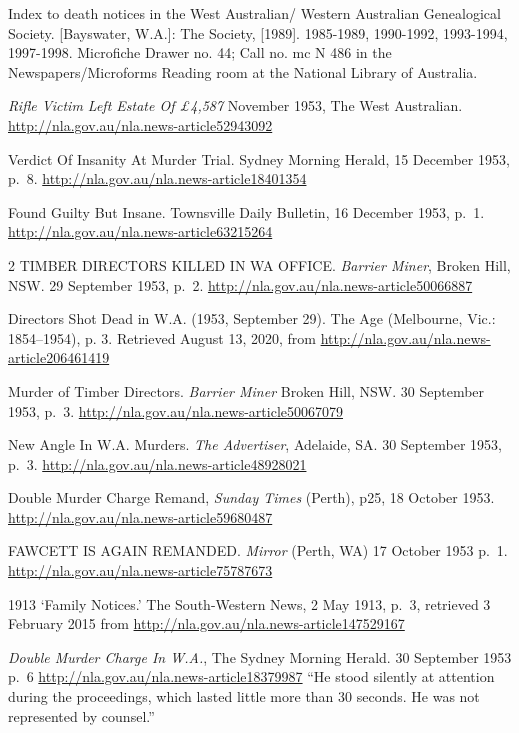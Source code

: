 \begin{thebibliography}{999}
	Index to death notices in the West Australian/ Western Australian Genealogical Society. [Bayswater, W.A.]: The Society, [1989]. 1985-1989, 1990-1992, 1993-1994, 1997-1998. Microfiche Drawer no. 44; Call no. mc N 486 in the Newspapers/Microforms Reading room at the National Library of Australia.

	\emph{Rifle Victim Left Estate Of \pounds 4,587} November 1953, The West Australian.
	\url{http://nla.gov.au/nla.news-article52943092}

	Verdict Of Insanity At Murder Trial. Sydney Morning Herald, 15 December 1953, p.\ 8.
	\url{http://nla.gov.au/nla.news-article18401354}

	Found Guilty But Insane. Townsville Daily Bulletin, 16 December 1953, p.\ 1.
	\url{http://nla.gov.au/nla.news-article63215264}

	 2 TIMBER DIRECTORS KILLED IN WA OFFICE. \emph{Barrier Miner}, Broken Hill, NSW. 29 September 1953, p.\ 2.
	 \url{http://nla.gov.au/nla.news-article50066887}

	Directors Shot Dead in W.A. (1953, September 29). The Age (Melbourne, Vic.: 1854--1954), p. 3.
	Retrieved August 13, 2020, from \url{http://nla.gov.au/nla.news-article206461419}

	Murder of Timber Directors. \emph{Barrier Miner} Broken Hill, NSW. 30 September 1953, p.\ 3.
	\url{http://nla.gov.au/nla.news-article50067079}

	New Angle In W.A. Murders. \emph{The Advertiser}, Adelaide, SA. 30 September 1953, p.\ 3.
	\url{http://nla.gov.au/nla.news-article48928021}

	Double Murder Charge Remand, \emph{Sunday Times} (Perth), p25, 18 October 1953.
	\url{http://nla.gov.au/nla.news-article59680487}

	FAWCETT IS AGAIN REMANDED. \emph{Mirror} (Perth, WA) 17 October 1953 p.\ 1.
	\url{http://nla.gov.au/nla.news-article75787673}

	1913 `Family Notices.' The South-Western News, 2 May 1913, p.~3,
	retrieved 3 February 2015 from \url{http://nla.gov.au/nla.news-article147529167}

	\emph{Double Murder Charge In W.A.}, The Sydney Morning Herald. 30 September 1953 p.~6
	\url{http://nla.gov.au/nla.news-article18379987}
	``He stood silently at attention during the proceedings, which lasted little more than 30 seconds.
	He was not represented by counsel.''


\end{thebibliography}

